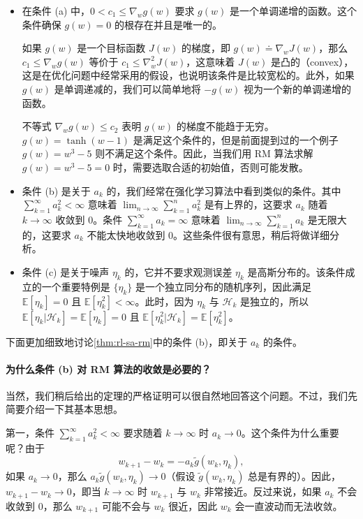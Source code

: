 \begin{itemize}
  \item 在条件 (a) 中，$0 < c_1 \leqslant \nabla_w g(w)$ 要求 $g(w)$ 是一个单调递增的函数。这个条件确保 $g(w) = 0$ 的根存在并且是唯一的。

  如果 $g(w)$ 是一个目标函数 $J(w)$ 的梯度，即 $g(w) \doteq \nabla_w J(w)$，那么 $c_1 \leqslant \nabla_w g(w)$ 等价于 $c_1 \leqslant \nabla_w^2 J(w)$，这意味着 $J(w)$ 是凸的（convex），这是在优化问题中经常采用的假设，也说明该条件是比较宽松的。此外，如果 $g(w)$ 是单调递减的，我们可以简单地将 $-g(w)$ 视为一个新的单调递增的函数。

  不等式 $\nabla_w g(w) \leqslant c_2$ 表明 $g(w)$ 的梯度不能趋于无穷。$g(w) = \tanh(w - 1)$ 是满足这个条件的，但是前面提到过的一个例子 $g(w) = w^3 - 5$ 则不满足这个条件。因此，当我们用 RM 算法求解 $g(w) = w^3 - 5 = 0$ 时，需要选取合适的初始值，否则可能发散。

  \item 条件 (b) 是关于 $a_k$ 的，我们经常在强化学习算法中看到类似的条件。其中 $\sum_{k=1}^{\infty} a_k^2 < \infty$ 意味着 $\lim_{n \to \infty} \sum_{k=1}^{n} a_k^2$ 是有上界的，这要求 $a_k$ 随着 $k \to \infty$ 收敛到 0。条件 $\sum_{k=1}^{\infty} a_k = \infty$ 意味着 $\lim_{n \to \infty} \sum_{k=1}^{n} a_k$ 是无限大的，这要求 $a_k$ 不能太快地收敛到 0。这些条件很有意思，稍后将做详细分析。

  \item 条件 (c) 是关于噪声 $\eta_k$ 的，它并不要求观测误差 $\eta_k$ 是高斯分布的。该条件成立的一个重要特例是 $\{\eta_k\}$ 是一个独立同分布的随机序列，因此满足 $\mathbb{E}[\eta_k] = 0$ 且 $\mathbb{E}[\eta_k^2] < \infty$。此时，因为 $\eta_k$ 与 $\mathcal{H}_k$ 是独立的，所以 $\mathbb{E}[\eta_k | \mathcal{H}_k] = \mathbb{E}[\eta_k] = 0$ 且 $\mathbb{E}[\eta_k^2 | \mathcal{H}_k] = \mathbb{E}[\eta_k^2]$。
\end{itemize}

下面更加细致地讨论\cref{thm:rl-sa-rm}中的条件 (b)，即关于 $a_k$ 的条件。

\paragraph{为什么条件 (b) 对 RM 算法的收敛是必要的？}
当然，我们稍后给出的定理的严格证明可以很自然地回答这个问题。不过，我们先简要介绍一下其基本思想。

第一，条件 $\sum_{k=1}^{\infty} a_k^2 < \infty$ 要求随着 $k \to \infty$ 时 $a_k \to 0$。这个条件为什么重要呢？由于
\begin{equation}
w_{k+1} - w_k = -a_k \tilde{g}(w_k, \eta_k),
\end{equation}
如果 $a_k \to 0$，那么 $a_k \tilde{g}(w_k, \eta_k) \to 0$（假设 $\tilde{g}(w_k, \eta_k)$ 总是有界的）。因此，$w_{k+1} - w_k \to 0$，即当 $k \to \infty$ 时 $w_{k+1}$ 与 $w_k$ 非常接近。反过来说，如果 $a_k$ 不会收敛到 0，那么 $w_{k+1}$ 可能不会与 $w_k$ 很近，因此 $w_k$ 会一直波动而无法收敛。

